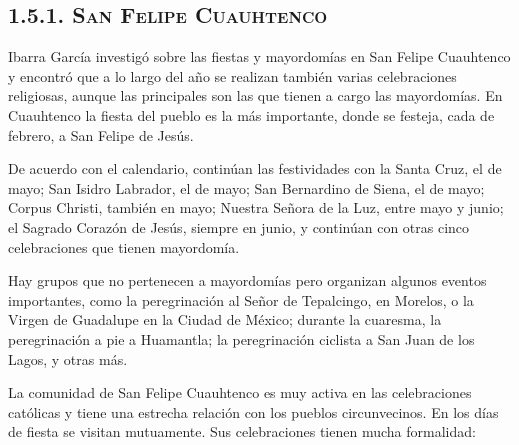 \documentclass[14pt,letterpaper,twoside]{extbook} %
\begin{document}
\subsection*{\mdseries\large\textsc{1.5.1. San Felipe Cuauhtenco}}

\noindent Ibarra García investigó sobre las fiestas y mayordomías en San Felipe Cuauhtenco y encontró que a lo largo del año se realizan también varias celebraciones religiosas, aunque las principales son las que tienen a cargo las mayordomías. En Cuauhtenco la fiesta del pueblo es la más importante, donde se festeja, cada  de febrero, a San Felipe de Jesús.

De acuerdo con el calendario, continúan las festividades con la Santa Cruz, el  de mayo; San Isidro Labrador, el  de mayo; San Bernardino de Siena, el  de mayo; Corpus Christi, también en mayo; Nuestra Señora de la Luz, entre mayo y junio; el Sagrado Corazón de Jesús, siempre en junio, y continúan con otras cinco celebraciones que tienen mayordomía.

Hay grupos que no pertenecen a mayordomías pero organizan algunos eventos importantes, como la peregrinación al Señor de Tepalcingo, en Morelos, o la Virgen de Guadalupe en la Ciudad de México; durante la cuaresma, la peregrinación a pie a Huamantla; la peregrinación ciclista a San Juan de los Lagos, y otras más.

La comunidad de San Felipe Cuauhtenco es muy activa en las celebraciones católicas y tiene una estrecha relación con los pueblos circunvecinos. En los días de fiesta se visitan mutuamente. Sus celebraciones tienen mucha formalidad:
\end{document}
